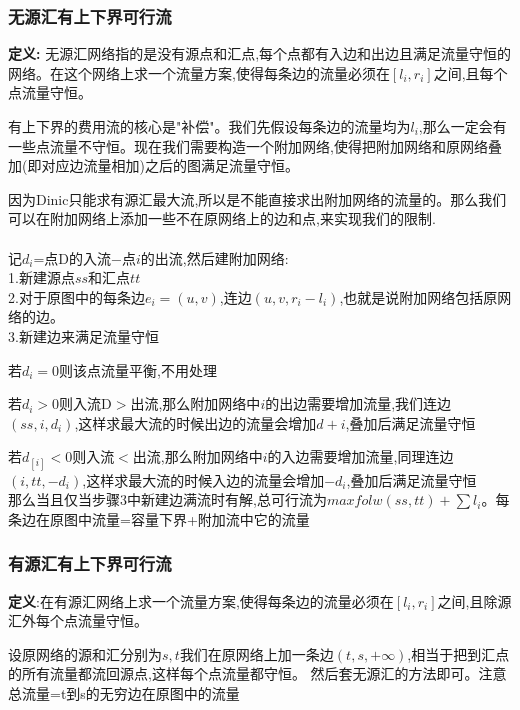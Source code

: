 \documentclass[12pt, a4paper, oneside]{ctexart}
\begin{document}
\subsubsection{无源汇有上下界可行流}
\textbf{定义:} 无源汇网络指的是没有源点和汇点,每个点都有入边和出边且满足流量守恒的网络。在这个网络上求一个流量方案,使得每条边的流量必须在$[l_{i},r_{i}]$之间,且每个点流量守恒。\par
有上下界的费用流的核心是"补偿"。我们先假设每条边的流量均为$l_{i}$,那么一定会有一些点流量不守恒。现在我们需要构造一个附加网络,使得把附加网络和原网络叠加(即对应边流量相加)之后的图满足流量守恒。\par
因为Dinic只能求有源汇最大流,所以是不能直接求出附加网络的流量的。那么我们可以在附加网络上添加一些不在原网络上的边和点,来实现我们的限制.\\\\
记$d_{i}$=点D的入流−点$i$的出流,然后建附加网络:\\
1.新建源点$ss$和汇点$tt$\\
2.对于原图中的每条边$e_{i}=(u,v)$,连边$(u,v,r_{i}-l_{i})$,也就是说附加网络包括原网络的边。\\
3.新建边来满足流量守恒\par
若$d_{i}=0$则该点流量平衡,不用处理\par
若$d_{i}>0$则入流D$>$出流,那么附加网络中$i$的出边需要增加流量,我们连边$(ss,i,d_{i})$,这样求最大流的时候出边的流量会增加$d+{i}$,叠加后满足流量守恒\par
若$d_[i]<0$则入流$<$出流,那么附加网络中$i$的入边需要增加流量,同理连边$(i,tt,-d_{i})$,这样求最大流的时候入边的流量会增加$-d_{i}$,叠加后满足流量守恒\\
那么当且仅当步骤3中新建边满流时有解,总可行流为$maxfolw(ss,tt)+\sum{l_{i}}$。每条边在原图中流量=容量下界+附加流中它的流量

\subsubsection{有源汇有上下界可行流}
\textbf{定义}:在有源汇网络上求一个流量方案,使得每条边的流量必须在$[l_{i},r_{i}]$之间,且除源汇外每个点流量守恒。\par
设原网络的源和汇分别为$s,t$我们在原网络上加一条边${(t,s,+\infty)}$,相当于把到汇点的所有流量都流回源点,这样每个点流量都守恒。
然后套无源汇的方法即可。注意总流量=t到s的无穷边在原图中的流量
\end{document}
